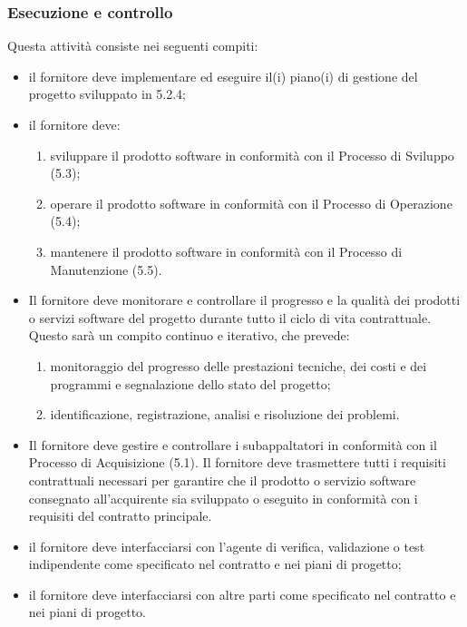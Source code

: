     \subsubsection{Esecuzione e controllo}\label{sec:esecuzione e controllo}
        Questa attività consiste nei seguenti compiti:
        \begin{itemize}
            \item il fornitore deve implementare ed eseguire il(i) piano(i) di gestione del progetto sviluppato in 5.2.4;
            \item il fornitore deve:
            \begin{enumerate}
                \item sviluppare il prodotto software in conformità con il Processo di Sviluppo (5.3);
                \item operare il prodotto software in conformità con il Processo di Operazione (5.4);
                \item mantenere il prodotto software in conformità con il Processo di Manutenzione (5.5).
            \end{enumerate}
            \item Il fornitore deve monitorare e controllare il progresso e la qualità dei prodotti o servizi software del progetto durante tutto il ciclo di vita contrattuale. Questo sarà un compito continuo e iterativo, che prevede:
            \begin{enumerate}
                \item monitoraggio del progresso delle prestazioni tecniche, dei costi e dei programmi e segnalazione dello stato del progetto; 
                \item identificazione, registrazione, analisi e risoluzione dei problemi.
            \end{enumerate} 
            \item Il fornitore deve gestire e controllare i subappaltatori in conformità con il Processo di Acquisizione (5.1). Il fornitore deve trasmettere tutti i requisiti contrattuali necessari per garantire che il prodotto o servizio software consegnato all’acquirente sia sviluppato o eseguito in conformità con i requisiti del contratto principale.
            \item il fornitore deve interfacciarsi con l'agente di verifica, validazione o test indipendente come specificato nel contratto e nei piani di progetto;
            \item il fornitore deve interfacciarsi con altre parti come specificato nel contratto e nei piani di progetto.
        \end{itemize}

